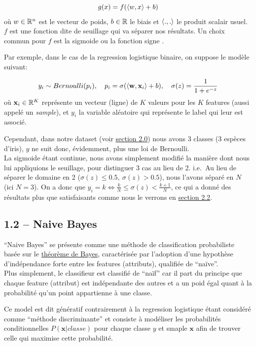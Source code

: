 \documentclass[
]{article}
\begin{document}
\[
g(x) = f(\langle w, x \rangle + b)
\] où \(w \in \mathbb{R}^n\) est le vecteur de poids, \(b \in \mathbb{R}\) le biais et
\(\langle ., . \rangle\) le produit scalair usuel. \(f\) est une fonction
dite de seuillage qui va séparer nos résultats. Un choix commun pour
\(f\) est la sigmoide ou la fonction signe
\cite{ClassifieurLineaire2022}.

Par exemple, dans le cas de la regression logistique binaire, on suppose
le modèle suivant:

\[
y_i \sim Bernoulli(p_i),\quad p_i = \sigma(\langle \mathbf{w}, \mathbf{x}_i \rangle + b),\quad \sigma(z) = \frac{1}{1 + e^{-z}}
\] où \(\mathbf{x}_i \in \mathbb{R}^K\) représente un vecteur (ligne) de \(K\)
valeurs pour les \(K\) features (aussi appelé un \emph{sample}), et
\(y_i\) la variable aléatoire qui représente le label qui leur est
associé.

Cependant, dans notre dataset (voir
\href{#choix-du-dataset-outils-utilisuxe9s}{section 2.0}) nous avons 3
classes (3 espèces d'iris), \(y\) ne suit donc, évidemment, plus une loi
de Bernoulli.\\
La sigmoide étant continue, nous avons simplement modifié la manière
dont nous lui appliquions le seuillage, pour distinguer 3 cas au lieu de
2. i.e.~Au lieu de séparer le domaine en 2
(\(\sigma(z) \leq 0.5,\ \sigma(z) > 0.5\)), nous l'avons séparé en \(N\)
(ici \(N = 3\)). On a donc que
\(y_i = k \Leftrightarrow \frac{k}{N} \leq \sigma(z) < \frac{k + 1}{N}\),
ce qui a donné des résultats plus que satisfaisants comme nous le
verrons en \href{#ruxe9gression-logistique-1}{section 2.2}.

\hypertarget{naive-bayes}{%
\subsection{1.2 -- Naive Bayes}\label{naive-bayes}}

``Naive Bayes'' se présente comme une méthode de classification
probabiliste basée sur le
\href{https://en.wikipedia.org/wiki/Bayes\%27_theorem}{théorème de
Bayes}, caractérisée par l'adoption d'une hypothèse d'indépendance forte
entre les features (attributs), qualifiée de ``naïve''.\\
Plus simplement, le classifieur est classifié de ``naïf'' car il part du
principe que chaque feature (attribut) est indépendante des autres et a
un poid égal quant à la probabilité qu'un point appartienne à une
classe.

Ce model est dit génératif contrairement à la regression logistique
étant considéré comme ``méthode discriminante''
\cite{ClassifieurLineaire2022} et consiste à modéliser les probabilités
conditionnelles \(P(\mathbf{x}| classe)\) pour chaque classe \(y\) et
smaple \(\mathbf{x}\) afin de trouver celle qui maximise cette
probabilité.
\end{document}
